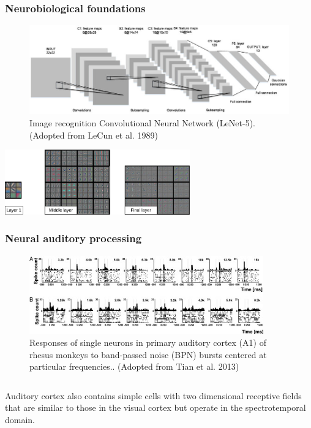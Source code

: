 \documentclass[a4paper,9pt]{beamer}
\theoremstyle{mytheoremstyle}
\begin{document}
\begin{frame}
\frametitle{Neurobiological foundations}
\begin{figure}
\begin{center}
  \includegraphics[width=\textwidth]{res/lenet.png}
\end{center}
	\caption{Image recognition Convolutional Neural Network (LeNet-5). (Adopted from LeCun et al. 1989)}
\end{figure}
\begin{center}
\includegraphics[width=0.6\textwidth]{res/filter_vis.png}
\end{center}
\end{frame}

\begin{frame}
\frametitle{Neural auditory processing}
\begin{figure}
\begin{center}
  \includegraphics[width=0.9\textwidth]{res/simple_cells_auditory_cortes.png}
\end{center}
	\caption{Responses of single neurons in primary auditory cortex (A1) of rhesus monkeys to band-passed noise (BPN) bursts centered at particular frequencies.. (Adopted from Tian et al. 2013)}
\end{figure}
\begin{columns}
\begin{exampleblock}{}
Auditory cortex also contains simple cells with two dimensional receptive fields that are similar to those in the visual cortex but operate in the spectrotemporal domain.
\end{exampleblock}
\end{columns}
\end{frame}
\end{document}
